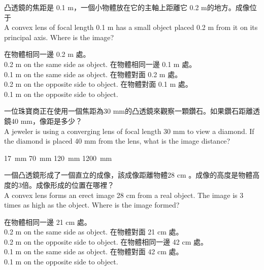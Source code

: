 \documentclass[beamer=true]{standalone}
\begin{document}
\begin{eg}
    凸透鏡的焦距是 0.1 m，一個小物體放在它的主軸上距離它 0.2 m的地方。成像位于\\A convex lens of focal length 0.1 m has a small object placed 0.2 m from it on its principal axis. Where is the image?
    \begin{tasks}
        \task 在物體相同一邊 0.2 m 處。\\
        0.2 m on the same side as object.
        \task 在物體相同一邊 0.1 m 處。\\
        0.1 m on the same side as object.
        \task 在物體對面 0.2 m 處。\\0.2 m on the opposite side to object.
        \task 在物體對面 0.1 m 處。\\0.1 m on the opposite side to object.
    \end{tasks}
\end{eg}

\begin{eg}
    一位珠寶商正在使用一個焦距為30 mm的凸透鏡來觀察一顆鑽石。如果鑽石距離透鏡40 mm，像距是多少？\\A jeweler is using a converging lens of focal length 30 mm to view a diamond. If the diamond is placed 40 mm from the lens, what is the image distance?
    \begin{tasks}
        \task \qty{17}{mm}
        \task \qty{70}{mm}
        \task \qty{120}{mm}
        \task \qty{1200}{mm}
    \end{tasks}
\end{eg}



\begin{eg}
    一個凸透鏡形成了一個直立的成像，該成像距離物體28 cm 。成像的高度是物體高度的3倍。成像形成的位置在哪裡？\\A convex lens forms an erect image 28 cm from a real object. The image is 3 times as high as the object. Where is the image formed?
    \begin{tasks}
        \task 在物體相同一邊 21 cm 處。\\
        0.2 m on the same side as object.
        \task 在物體對面 21 cm 處。\\
        0.2 m on the opposite side to object.
        \task 在物體相同一邊 42 cm 處。\\
        0.1 m on the same side as object.
        \task 在物體對面 42 cm 處。\\
        0.1 m on the opposite side to object.
    \end{tasks}

\end{eg}
\end{document}
